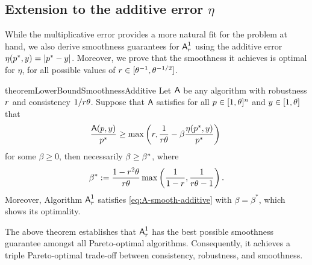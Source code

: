 \subsection{Extension to the additive error \texorpdfstring{$\eta$}{}}\label{sec:additive-error-smooth}
While the multiplicative error provides a more natural fit for the problem at hand, we also derive smoothness guarantees for $\mbox{\textup{\textsf{A}}}^1_r$ using the additive error $\eta(p^*,y) = |p^* - y|$. Moreover, we prove that the smoothness it achieves is optimal for $\eta$, for all possible values of $r \in [\theta^{-1}, \theta^{-1/2}]$.


\begin{restatable}{theorem}{LowerBoundSmoothnessAdditive}\label{thm: [deterministic Pareto-Optimal smooth Algorithm] additive smoothness}
Let $\mbox{\textup{\textsf{A}}}$ be any algorithm with robustness $r$ and consistency $1/r \theta$. Suppose that $\mbox{\textup{\textsf{A}}}$ satisfies for all $p \in [1,\theta]^n$ and $y \in [1,\theta]$ that
\begin{equation}\label{eq:A-smooth-additive}
\frac{\mbox{\textup{\textsf{A}}}(p, y)}{p^*} \geq 
\max\left(
r, \frac{1}{r \theta} - \beta \frac{\eta(p^*, y)}{p^*}
\right)\;
\end{equation}
for some $\beta \geq 0$, then necessarily $\beta \geq \beta^*$, where
\[
\beta^* := \frac{1-r^2\theta}{r \theta} \max\left( \frac{1}{1-r}, \frac{1}{r \theta - 1} \right).
\]
Moreover, Algorithm $\mbox{\textup{\textsf{A}}}^1_r$ satisfies  \eqref{eq:A-smooth-additive} with $\beta = \beta^*$, which shows its optimality.
\end{restatable}

The above theorem establishes that  $\mbox{\textup{\textsf{A}}}^1_r$ has the best possible smoothness guarantee amongst all Pareto-optimal algorithms.
Consequently, it achieves a triple Pareto-optimal trade-off between consistency, robustness, and smoothness.

